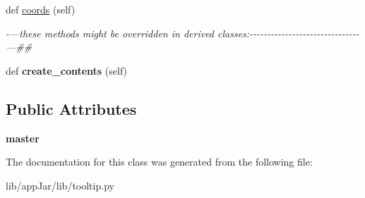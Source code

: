 \begin{DoxyCompactItemize}
def \hyperlink{classlib_1_1tooltip_1_1_tool_tip_a7aac73112f2f5604e201434d80579314}{coords} (self)
\begin{DoxyCompactList}\small\item\em -\/---these methods might be overridden in derived classes\+:-\/-\/-\/-\/-\/-\/-\/-\/-\/-\/-\/-\/-\/-\/-\/-\/-\/-\/-\/-\/-\/-\/-\/-\/-\/-\/-\/-\/-\/-\/-\/---\#\# \end{DoxyCompactList}\item 
\mbox{\label{classlib_1_1tooltip_1_1_tool_tip_a62a096663b7d21602f77568d38a74705}} 
def {\bfseries create\+\_\+contents} (self)
\end{DoxyCompactItemize}
\subsection*{Public Attributes}
\begin{DoxyCompactItemize}
\item 
\mbox{\label{classlib_1_1tooltip_1_1_tool_tip_af78922fa16bcbd08d5e6ab4b4132cfe4}} 
{\bfseries master}
\end{DoxyCompactItemize}


The documentation for this class was generated from the following file\+:\begin{DoxyCompactItemize}
\item 
lib/app\+Jar/lib/tooltip.\+py\end{DoxyCompactItemize}
